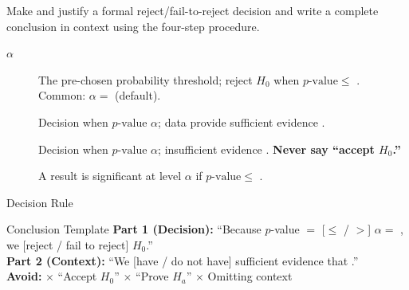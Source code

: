 \documentclass[10pt]{article}
\begin{document}
\namedateperiod

\vspace{0.15in}

\begin{objectivebox}
Make and justify a formal reject/fail-to-reject decision and write a complete conclusion in
context using the four-step procedure.
\end{objectivebox}

\begin{vocabbox}
\begin{description}
  \item[ $\alpha$] The pre-chosen probability threshold; reject
        $H_0$ when $p\text{-value} \le$ \ans{$\alpha$}. Common: $\alpha =$  (default).
  \item[] Decision when $p\text{-value}$ \ans{$\le$} $\alpha$; data provide
        sufficient evidence .
  \item[] Decision when $p\text{-value}$ \ans{$>$} $\alpha$; insufficient
        evidence . \textbf{Never say ``accept $H_0$.''}
  \item[] A result is significant at level $\alpha$ if
        $p\text{-value} \le$ \ans{$\alpha$}.
\end{description}
\end{vocabbox}

\begin{notesbox}{Decision Rule}
\begin{center}
\end{center}
\end{notesbox}

\begin{notesbox}{Conclusion Template}
\textbf{Part 1 (Decision):} ``Because $p$-value $=$ \ans{[value]} [$ \le$ / $>$] $\alpha = $ \ans{[value]},
we [reject / fail to reject] $H_0$.''\\[6pt]
\textbf{Part 2 (Context):} ``We [have / do not have] sufficient evidence that .''\\[6pt]
\textbf{Avoid:} \textbf{$\times$} ``Accept $H_0$'' \quad \textbf{$\times$} ``Prove $H_a$'' \quad \textbf{$\times$} Omitting context
\end{notesbox}
\end{document}
